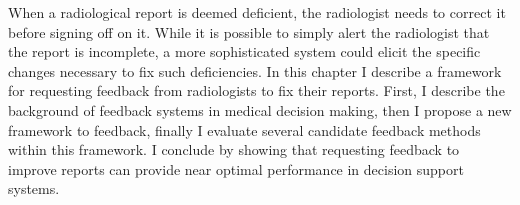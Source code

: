 When a radiological report is deemed deficient, the radiologist needs to correct it before signing off on it. While it is possible to simply alert the radiologist that the report is incomplete, a more sophisticated system could elicit the specific changes necessary to fix such deficiencies. In this chapter I describe a framework for requesting feedback from radiologists to fix their reports. First, I describe the background of feedback systems in medical decision making, then I propose a new framework to feedback, finally I evaluate several candidate feedback methods within this framework. I conclude by showing that requesting feedback to improve reports can provide near optimal performance in decision support systems.